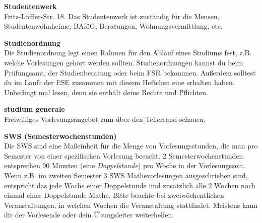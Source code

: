 \begin{multicols}{2}
\textbf{Studentenwerk} \\
Fritz-Löffler-Str. 18.
Das Studentenwerk ist zuständig für die Mensen, Studentenwohnheime, BAföG, Beratungen, Wohnungsvermittlung, etc.~


\textbf{Studienordnung} \\
Die Studienordnung legt einen Rahmen für den Ablauf eines Studiums fest, z.B. welche Vorlesungen gehört werden sollten.
Studienordnungen kannst du beim Prüfungsamt, der Studienberatung oder beim FSR bekommen.
Außerdem solltest du im Laufe der ESE zusammen mit diesem Heftchen eine erhalten haben.
Unbedingt mal lesen, denn sie enthält deine Rechte und Pflichten.

\textbf{studium generale} \\
Freiwilliges Vorlesungsangebot zum über-den-Tellerrand-schauen.

\textbf{SWS (Semesterwochenstunden)} \\
Die SWS sind eine Maßeinheit für die Menge von Vorlesungsstunden, die man pro Semester von einer spezifischen Vorlesung besucht.
2 Semesterwochenstunden entsprechen 90 Minuten (eine \emph{Doppelstunde}) pro Woche in der Vorlesungszeit.
Wenn z.B. im zweiten Semester 3 SWS Mathevorlesungen ausgeschrieben sind, entspricht das jede Woche einer Doppelstunde und zusätzlich alle 2 Wochen noch einmal einer Doppelstunde Mathe.
Bitte beachte bei zweiwöchentlichen Veranstaltungen, in welchen Wochen die Veranstaltung stattfindet. Meistens kann dir der Vorlesende oder dein Übungsleiter weiterhelfen.




\end{multicols}
